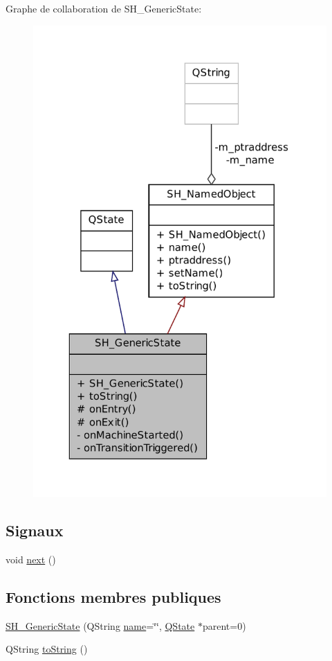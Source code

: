 Graphe de collaboration de S\-H\-\_\-\-Generic\-State\-:
\nopagebreak
\begin{figure}[H]
\begin{center}
\leavevmode
\includegraphics[width=319pt]{classSH__GenericState__coll__graph}
\end{center}
\end{figure}
\subsection*{Signaux}
\begin{DoxyCompactItemize}
\item 
void \hyperlink{classSH__GenericState_a030e67a872956135c52e6876d960a7b5}{next} ()
\end{DoxyCompactItemize}
\subsection*{Fonctions membres publiques}
\begin{DoxyCompactItemize}
\item 
\hyperlink{classSH__GenericState_a3cc3cb1491b812dfdd032fc6438dfd4e}{S\-H\-\_\-\-Generic\-State} (Q\-String \hyperlink{classSH__NamedObject_a970f265df31b28b2179bbbceb6170ac2}{name}=\char`\"{}\char`\"{}, \hyperlink{classQState}{Q\-State} $\ast$parent=0)
\item 
Q\-String \hyperlink{classSH__GenericState_a5480c5ee725fd801d8f6292cd4c803b8}{to\-String} ()
\end{DoxyCompactItemize}

